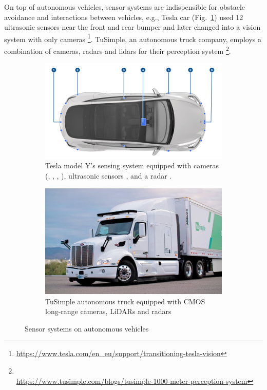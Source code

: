 On top of autonomous vehicles, sensor systems are indispensible for obstacle avoidance and interactions between vehicles, 
e.g., Tesla car (Fig.~\ref{fig:intro-tesla}) used 12 ultrasonic sensors 
near the front and rear bumper 
and later changed into a vision system with only cameras 
\footnote{\url{https://www.tesla.com/en_eu/support/transitioning-tesla-vision}}. 
TuSimple, an autonomous truck company, employs a combination of cameras, radars and lidars 
for their perception system \footnote{\\\url{https://www.tusimple.com/blogs/tusimple-1000-meter-perception-system}}. 

\begin{figure}[ht] 
    \centering 

    \begin{subfigure}[b]{0.49\textwidth} 
        \includegraphics[width=\textwidth]{figures/tesla.png} 
        \caption{
        Tesla model Y's sensing system
        equipped with cameras (, 
        , 
        , ),
        ultrasonic sensors , and a radar .
        }
        \label{fig:intro-tesla} 
    \end{subfigure} \hfill
    \begin{subfigure}[b]{0.4\textwidth} 
        \includegraphics[width=\textwidth]{figures/tusimple.jpg} 
        \caption{TuSimple autonomous truck equipped with CMOS long-range cameras, 
        LiDARs and radars} 
        \label{fig:intro-truckcam} 
    \end{subfigure} 
    \caption{Sensor systems on autonomous vehicles}
    \label{fig:intro-autonomous-vehicles}
\end{figure} 


